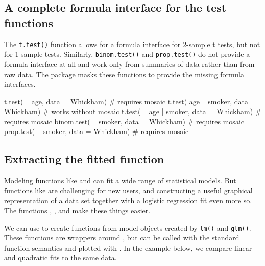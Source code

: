 \subsection{A complete formula interface for the test
functions}\label{a-complete-formula-interface-for-the-test-functions}

The \texttt{t.test()} function allows for a formula interface for
2-sample t tests, but not for 1-sample tests. Similarly,
\texttt{binom.test()} and \texttt{prop.test()} do not provide a formula
interface at all and work only from summaries of data rather than from
raw data. The  package masks these functions to provide the
missing formula interfaces.

\begin{Schunk}
\begin{Sinput}
t.test( ~ age, data = Whickham)           # requires mosaic
t.test( age ~ smoker, data = Whickham)    # works without mosaic
t.test( ~ age | smoker, data = Whickham)  # requires mosaic
binom.test( ~ smoker, data = Whickham)    # requires mosaic
prop.test( ~ smoker, data = Whickham)     # requires mosaic
\end{Sinput}
\end{Schunk}

\subsection{Extracting the fitted
function}\label{extracting-the-fitted-function}

Modeling functions like  and  can fit a wide
range of statistical models. But functions like  are
challenging for new users, and constructing a useful graphical
representation of a data set together with a logistic regression fit
even more so. The  functions ,
, and  make these things easier.

We can use  to create functions from model objects
created by \texttt{lm()} and \texttt{glm()}. These functions are
wrappers around , but can be called with the standard
function semantics and plotted with . In the example
below, we compare linear and quadratic fits to the same data.

